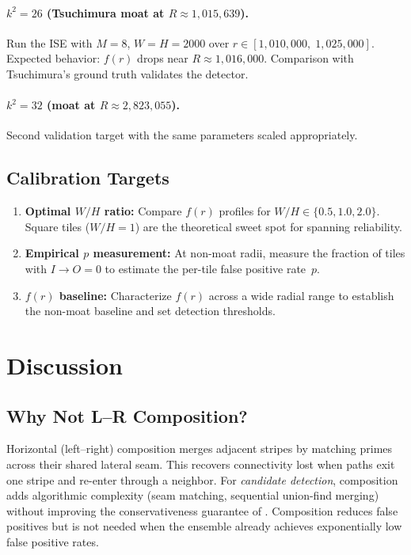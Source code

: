 \documentclass[11pt,a4paper]{article}
\theoremstyle{definition}
\theoremstyle{remark}
\newcommand{\IO}{I{\to}O}
\begin{document}
\paragraph{$k^2 = 26$ (Tsuchimura moat at $R \approx 1{,}015{,}639$).}
Run the ISE with $M = 8$, $W = H = 2000$ over
$r \in [1{,}010{,}000,\; 1{,}025{,}000]$.  Expected behavior: $f(r)$
drops near $R \approx 1{,}016{,}000$.  Comparison with Tsuchimura's
ground truth validates the detector.

\paragraph{$k^2 = 32$ (moat at $R \approx 2{,}823{,}055$).}
Second validation target with the same parameters scaled appropriately.

\subsection{Calibration Targets}

\begin{enumerate}
  \item \textbf{Optimal $W/H$ ratio:} Compare $f(r)$ profiles for
    $W/H \in \{0.5, 1.0, 2.0\}$.  Square tiles ($W/H = 1$) are the
    theoretical sweet spot for spanning reliability.
  \item \textbf{Empirical $p$ measurement:} At non-moat radii,
    measure the fraction of tiles with $\IO = 0$ to estimate the
    per-tile false positive rate~$p$.
  \item \textbf{$f(r)$ baseline:} Characterize $f(r)$ across a wide
    radial range to establish the non-moat baseline and set detection
    thresholds.
\end{enumerate}

\section{Discussion}\label{sec:discussion}

\subsection{Why Not L--R Composition?}

Horizontal (left--right) composition merges adjacent stripes by
matching primes across their shared lateral seam.  This recovers
connectivity lost when paths exit one stripe and re-enter through a
neighbor.  For \emph{candidate detection}, composition adds
algorithmic complexity (seam matching, sequential union-find merging)
without improving the conservativeness guarantee of
.  Composition reduces false positives but is not
needed when the ensemble already achieves exponentially low false
positive rates.
\end{document}
